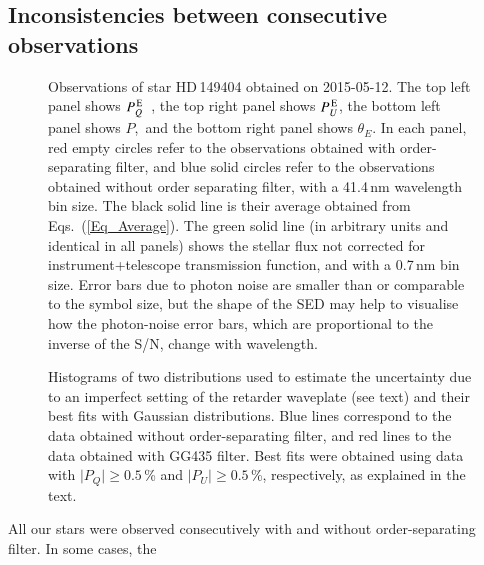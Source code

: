 \documentclass[a4paper]{aa}
\newcommand{\pq}{\ensuremath{P_Q}}
\newcommand{\pu}{\ensuremath{P_U}}
\newcommand{\pqe}{\ensuremath{P_Q^{\rm \,E}}}
\newcommand{\pue}{\ensuremath{P_U^{\rm \,E}}}
\newcommand{\pl}{\ensuremath{P}}
\begin{document}
\subsection{Inconsistencies between consecutive observations}\label{Sect_Incons}
\begin{figure*}
\begin{center}
\end{center}
\caption{\label{Fig_HD149404} Observations of star HD\,149404 obtained
  on 2015-05-12. The top
  left panel shows \pqe\, , the top right panel shows \pue, the bottom
  left panel shows \pl,\ and the bottom right panel shows $\theta_E$.
  In each panel, red empty circles refer to the observations obtained
  with order-separating filter, and blue solid circles refer to the
  observations obtained without order separating filter, with a
  41.4\,nm wavelength bin size.  The black solid line is their average
  obtained from Eqs.~(\ref{Eq_Average}). The green solid line (in arbitrary
  units and identical in
  all panels) shows the stellar flux not
  corrected for instrument+telescope transmission function, and with a
  0.7\,nm bin size.  Error bars due to photon noise are smaller than
  or comparable to the symbol size, but the shape of the SED may help to
  visualise how the photon-noise error bars, which are proportional to the
  inverse of the S/N, change with wavelength.}
\end{figure*}
\begin{figure}
\begin{center}
\end{center}
\caption{\label{Fig_Histos} Histograms of two distributions used to
  estimate the uncertainty due to an imperfect setting of the
  retarder waveplate (see text) and their best fits with Gaussian
  distributions. Blue lines correspond to the data obtained without
  order-separating filter, and red lines to the data obtained with
  GG435 filter. Best fits were obtained using data with $\vert \pq
  \vert \ge 0.5$\,\% and $\vert \pu \vert \ge 0.5$\,\%, respectively,
  as explained in the text.}
\end{figure}
All our stars were observed consecutively with and without order-separating filter.  In some cases, the
\end{document}
